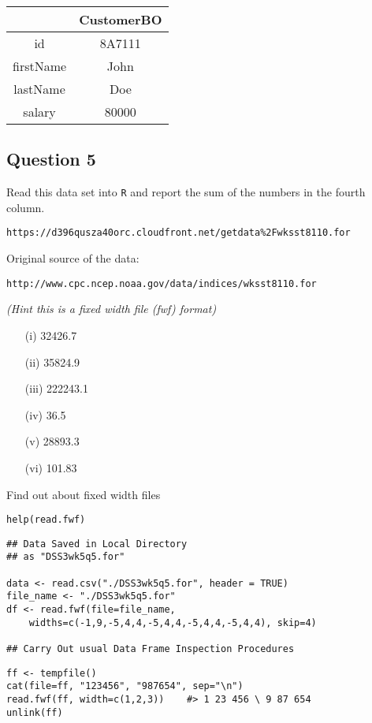 \documentclass[12pt]{article}
\begin{document}
\begin{center}
\bigskip
\begin{tabular}{|c|c|}
	\hline  & CustomerBO \\ \hline
	 id & 8A7111 \\ 
	 firstName  & John  \\ 
	 lastName & Doe \\ 
	 salary & 80000 \\ 
	\hline 
\end{tabular} 
\end{center}
\newpage
\subsection*{Question 5}
Read this data set into \texttt{R} and report the sum of the numbers in the fourth column. 
\begin{verbatim}
https://d396qusza40orc.cloudfront.net/getdata%2Fwksst8110.for 
\end{verbatim} 

\noindent Original source of the data:
\begin{verbatim}
http://www.cpc.ncep.noaa.gov/data/indices/wksst8110.for 
\end{verbatim} 

\noindent \textit{(Hint this is a fixed width file (fwf) format)}
\begin{itemize}
\item[(i)] 32426.7
\item[(ii)] 35824.9
\item[(iii)] 222243.1
\item[(iv)] 36.5
\item[(v)] 28893.3
\item[(vi)] 101.83
\end{itemize}

\begin{framed}
\noindent Find out about fixed width files
\begin{verbatim}
help(read.fwf)
\end{verbatim}	
\end{framed}
\newpage

\begin{framed}
\begin{verbatim}
## Data Saved in Local Directory
## as "DSS3wk5q5.for"

data <- read.csv("./DSS3wk5q5.for", header = TRUE)
file_name <- "./DSS3wk5q5.for"
df <- read.fwf(file=file_name,
    widths=c(-1,9,-5,4,4,-5,4,4,-5,4,4,-5,4,4), skip=4)

## Carry Out usual Data Frame Inspection Procedures
\end{verbatim}	
\end{framed}

\begin{framed}
\begin{verbatim}
ff <- tempfile()
cat(file=ff, "123456", "987654", sep="\n")
read.fwf(ff, width=c(1,2,3))    #> 1 23 456 \ 9 87 654
unlink(ff)
\end{verbatim}
\end{framed}
\end{document}

